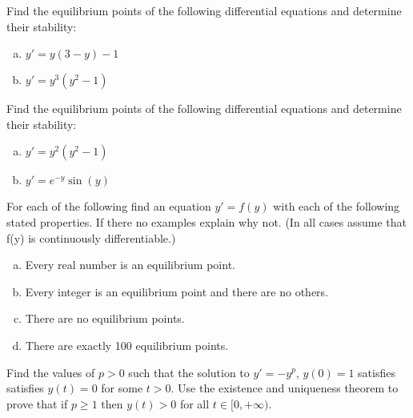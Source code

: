 \documentclass[12pt,letterpaper]{hmcpset}
\begin{document}

\begin{problem}[C1]
    Find the equilibrium points of the following
    differential equations and determine their 
    stability:
    \begin{enumerate}[(a)]
        \item $y' = y(3-y)-1$
        \item $y'=y^3(y^2-1)$
    \end{enumerate}
\end{problem}

\begin{solution}
    \vfill
\end{solution}
\clearpage

\begin{problem}[C2]
    Find the equilibrium points of the following
    differential equations and determine their 
    stability:
    \begin{enumerate}[(a)]
        \item $y' = y^2(y^2-1)$
        \item $y' = e^{-y}\sin(y)$
    \end{enumerate}
\end{problem}

\begin{solution}
    \vfill
\end{solution}
\clearpage

\begin{problem}[C3]
    For each of the following find an equation 
    $y' = f(y)$ with each of the following stated
    properties. If there no examples explain why not.
    (In all cases assume that f(y) is continuously
    differentiable.)
    \begin{enumerate}[(a)]
        \item Every real number is an equilibrium point.
        \item Every integer is an equilibrium point and
            there are no others.
        \item There are no equilibrium points.
        \item There are exactly 100 equilibrium points.
    \end{enumerate}
\end{problem}

\begin{solution}
    \vfill
\end{solution}
\clearpage

\begin{problem}[C4]
    Find the values of $p > 0$ such that the solution
    to $y'=-y^p$, $y(0)=1$ satisfies satisfies $y(t) =
    0$ for some $t > 0$. Use the existence and uniqueness
    theorem to prove that if $p\geq 1$ then $y(t) > 0$
    for all $t\in[0,+\infty)$.
\end{problem}
\end{document}
